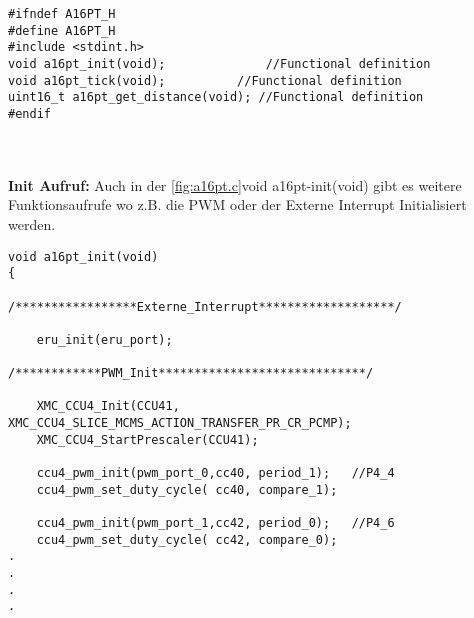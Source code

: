 \begin{minipage}{1\textwidth}
\begin{lstlisting}
#ifndef A16PT_H
#define A16PT_H
#include <stdint.h>
void a16pt_init(void);				//Functional definition
void a16pt_tick(void); 			//Functional definition
uint16_t a16pt_get_distance(void); //Functional definition
#endif
\end{lstlisting}
\label{fig:a16pt.h}
\end{minipage}\\
\\
\textbf{Init Aufruf:}
Auch in der \ref{fig:a16pt.c}void a16pt-init(void) gibt es weitere Funktionsaufrufe wo z.B. die PWM oder der Externe Interrupt Initialisiert werden.

\begin{minipage}{1\textwidth}
\begin{lstlisting}
void a16pt_init(void)
{

/*****************Externe_Interrupt*******************/

	eru_init(eru_port);

/************PWM_Init*****************************/

	XMC_CCU4_Init(CCU41, XMC_CCU4_SLICE_MCMS_ACTION_TRANSFER_PR_CR_PCMP);
	XMC_CCU4_StartPrescaler(CCU41);

	ccu4_pwm_init(pwm_port_0,cc40, period_1);	//P4_4
	ccu4_pwm_set_duty_cycle( cc40, compare_1);

	ccu4_pwm_init(pwm_port_1,cc42, period_0);	//P4_6
	ccu4_pwm_set_duty_cycle( cc42, compare_0);
.
.
.
.
\end{lstlisting}
\label{fig:a16pt.c}
\end{minipage}



